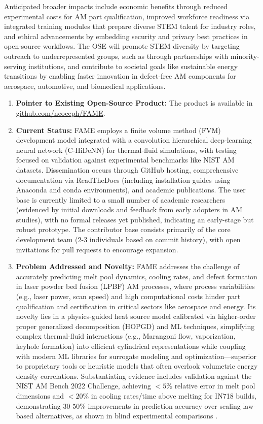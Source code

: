\documentclass[11pt]{article}
\begin{document}
Anticipated broader impacts include economic benefits through reduced experimental costs for AM part qualification, improved workforce readiness via integrated training modules that prepare diverse STEM talent for industry roles, and ethical advancements by embedding security and privacy best practices in open-source workflows. The OSE will promote STEM diversity by targeting outreach to underrepresented groups, such as through partnerships with minority-serving institutions, and contribute to societal goals like sustainable energy transitions by enabling faster innovation in defect-free AM components for aerospace, automotive, and biomedical applications.

\begin{enumerate}
    \item \textbf{Pointer to Existing Open-Source Product:} The product is available in \url{github.com/neoceph/FAME}.
    \item \textbf{Current Status:} FAME employs a finite volume method (FVM) development model integrated with a convolution hierarchical deep-learning neural network (C-HiDeNN) for thermal-fluid simulations, with testing focused on validation against experimental benchmarks like NIST AM datasets. Dissemination occurs through GitHub hosting, comprehensive documentation via ReadTheDocs (including installation guides using Anaconda and conda environments), and academic publications. The user base is currently limited to a small number of academic researchers (evidenced by initial downloads and feedback from early adopters in AM studies), with no formal releases yet published, indicating an early-stage but robust prototype. The contributor base consists primarily of the core development team (2-3 individuals based on commit history), with open invitations for pull requests to encourage expansion.
    \item \textbf{Problem Addressed and Novelty:} FAME addresses the challenge of accurately predicting melt pool dynamics, cooling rates, and defect formation in laser powder bed fusion (LPBF) AM processes, where process variabilities (e.g., laser power, scan speed) and high computational costs hinder part qualification and certification in critical sectors like aerospace and energy. Its novelty lies in a physics-guided heat source model calibrated via higher-order proper generalized decomposition (HOPGD) and ML techniques, simplifying complex thermal-fluid interactions (e.g., Marangoni flow, vaporization, keyhole formation) into efficient cylindrical representations while coupling with modern ML libraries for surrogate modeling and optimization—superior to proprietary tools or heuristic models that often overlook volumetric energy density correlations. Substantiating evidence includes validation against the NIST AM Bench 2022 Challenge, achieving $<5\%$ relative error in melt pool dimensions and $<20\%$ in cooling rates/time above melting for IN718 builds, demonstrating $30\text{-}50\%$ improvements in prediction accuracy over scaling law-based alternatives, as shown in blind experimental comparisons \cite{aminPhysicsGuidedHeat2024}.

\end{enumerate}
\end{document}
